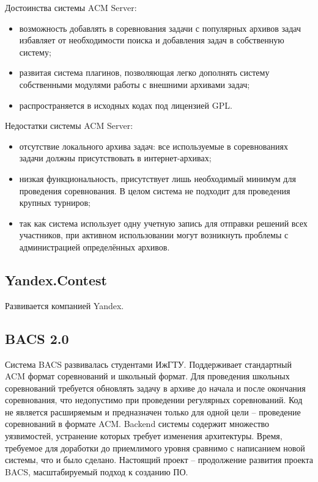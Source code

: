 Достоинства системы ACM Server:
\begin{itemize}
	\item возможность добавлять в соревнования задачи с популярных архивов задач
		избавляет от необходимости поиска и добавления задач в собственную систему;
	\item развитая система плагинов, позволяющая легко дополнять систему
		собственными модулями работы с внешними архивами задач;
	\item распространяется в исходных кодах под лицензией GPL.
\end{itemize}

Недостатки системы ACM Server:
\begin{itemize}
	\item отсутствие локального архива задач:
		все используемые в соревнованиях задачи должны присутствовать в интернет-архивах;
	\item низкая функциональность, присутствует лишь необходимый минимум для проведения соревнования.
		В целом система не подходит для проведения крупных турниров;
	\item так как система использует одну учетную запись для отправки решений всех участников,
		при активном использовании могут возникнуть проблемы с администрацией определённых архивов.
\end{itemize}

\subsection{Yandex.Contest}
Развивается компанией Yandex.

\subsection{BACS 2.0}
Система BACS \cite{bacs2} развивалась студентами ИжГТУ.
Поддерживает стандартный ACM формат соревнований и школьный формат.
Для проведения школьных соревнований требуется обновлять задачу в архиве до начала и после окончания соревнования,
что недопустимо при проведении регулярных соревнований.
Код не является расширяемым и предназначен только для одной цели -- проведение соревнований в формате ACM.
Backend системы содержит множество уязвимостей, устранение которых требует изменения архитектуры.
Время, требуемое для доработки до приемлимого уровня сравнимо с написанием новой системы, что и было сделано.
Настоящий проект -- продолжение развития проекта BACS, масштабируемый подход к созданию ПО.
